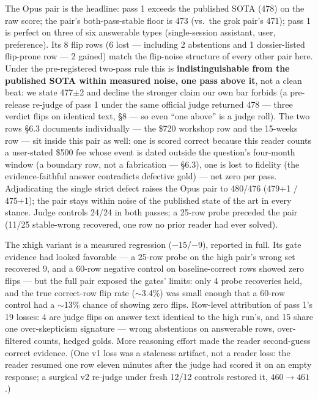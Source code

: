 \documentclass[11pt]{article}
\begin{document}
The Opus pair is the headline: pass 1 exceeds the published SOTA (478)
on the raw score; the pair's both-pass-stable floor is 473 (vs.\ the grok pair's 471);
pass 1 is perfect on three of six answerable types (single-session assistant,
user, preference). Its 8 flip rows (6 lost --- including 2 abstentions and 1
dossier-listed flip-prone row --- 2 gained) match the flip-noise structure of
every other pair here. Under the pre-registered two-pass rule this is
\textbf{indistinguishable from the published SOTA within measured noise, one pass above it}, not a
clean beat: we state 477$\pm$2 and decline the stronger claim our own bar
forbids (a pre-release re-judge of pass 1 under the same official judge
returned 478 --- three verdict flips on identical text, \S8 --- so even
``one above'' is a judge roll). The two rows \S6.3 documents individually
--- the \$720 workshop row and the 15-weeks row --- sit inside this pair as
well: one is scored correct because this reader counts a user-stated \$500
fee whose event is dated outside the question's four-month window (a
boundary row, not a fabrication --- \S6.3), one is lost to fidelity (the
evidence-faithful answer contradicts defective gold) --- net zero per pass.
Adjudicating the single strict defect raises the Opus pair to 480/476
(479+1 / 475+1); the pair stays within noise of the published state of the art
in every stance. Judge controls 24/24 in both passes; a 25-row probe preceded the pair
(11/25 stable-wrong recovered, one row no prior reader had ever solved).

The xhigh variant is a measured regression ($-15$/$-9$), reported in full.
Its gate evidence had looked favorable --- a 25-row probe on the high pair's
wrong set recovered 9, and a 60-row negative control on baseline-correct rows
showed zero flips --- but the full pair exposed the gates' limits: only 4
probe recoveries held, and the true correct-row flip rate ($\sim$3.4\%) was
small enough that a 60-row control had a $\sim$13\% chance of showing zero
flips. Row-level attribution of pass 1's 19 losses: 4 are judge flips on
answer text identical to the high run's, and 15 share one over-skepticism
signature --- wrong abstentions on answerable rows, over-filtered counts,
hedged golds. More reasoning effort made the reader second-guess correct
evidence. (One v1 loss was a staleness artifact, not a reader loss: the
reader resumed one row eleven minutes after the judge had scored it on an
empty response; a surgical v2 re-judge under fresh 12/12 controls restored
it, $460 \to 461$.)
\end{document}
